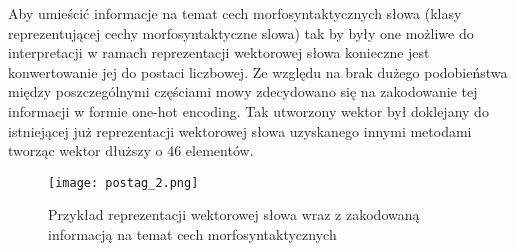 

Aby umieścić informacje na temat cech morfosyntaktycznych słowa (klasy reprezentującej cechy morfosyntaktyczne slowa) tak by były one możliwe do interpretacji w ramach reprezentacji wektorowej słowa konieczne jest konwertowanie jej do postaci liczbowej. Ze względu na brak dużego podobieństwa między poszczególnymi częściami mowy zdecydowano się na zakodowanie tej informacji w formie one-hot encoding. Tak utworzony wektor był doklejany do istniejącej już reprezentacji wektorowej słowa uzyskanego innymi metodami tworząc wektor dłuższy o 46 elementów.



\begin{figure}[!h]
    \label{fig:post_tag}
    \centering \texttt{[image: postag\_2.png]}
    \caption{Przykład reprezentacji wektorowej słowa wraz z zakodowaną informacją na temat cech  morfosyntaktycznych}
\end{figure}